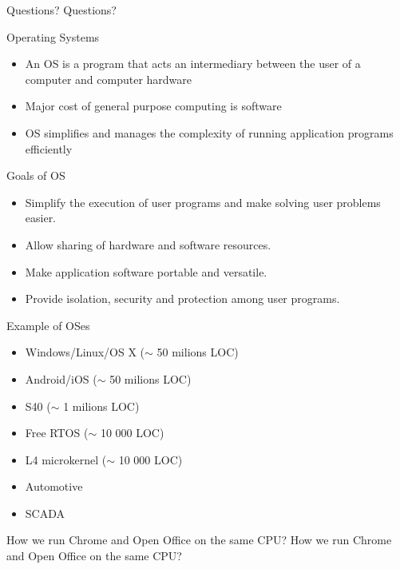 \documentclass{beamer}
\begin{document}
\begin{frame}{Questions?}
    Questions?
\end{frame}

\begin{frame}{Operating Systems}
  \begin{itemize}
  \item An OS is a program that acts an intermediary
    between the user of a computer and computer
    hardware
  \item Major cost of general purpose computing is
    software
  \item OS simplifies and manages the complexity of running
    application programs efficiently
  \end{itemize}
\end{frame}

\begin{frame}{Goals of OS}
  \begin{itemize}
  \item Simplify the execution of user programs and
    make solving user problems easier.
  \item Allow sharing of hardware and software resources.
  \item Make application software portable and versatile.
  \item Provide isolation, security and protection among
    user programs.
  \end{itemize}
\end{frame}

\begin{frame}{Example of OSes}
  \begin{itemize}
  \item Windows/Linux/OS X ($\sim$ 50 milions LOC)
  \item<2-> Android/iOS ($\sim$ 50 milions LOC)
  \item<3-> S40 ($\sim$ 1 milions LOC)
  \item<4-> Free RTOS ($\sim$ 10 000 LOC)
  \item<5-> L4 microkernel ($\sim$ 10 000 LOC)
  \item<6-> Automotive
  \item<7-> SCADA
  \end{itemize}
\end{frame}

\begin{frame}{How we run Chrome and Open Office on the same CPU?}
  How we run Chrome and Open Office on the same CPU?
\end{frame}
\end{document}
